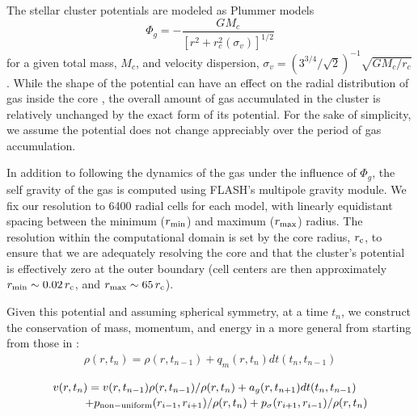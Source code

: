 \documentclass[fleqn,usenatbib]{mnras}
\begin{document}
 The stellar cluster potentials are modeled as Plummer models \citep{bruns2009,pflamm2009}
\begin{equation}
\Phi_g = - \frac{G M_c}{\left[r^2 + r_c^2(\sigma_v) \right]^{1/2}}
\end{equation}
for a  given total mass, $M_c$, and velocity dispersion, 
$\sigma_v = \left(3^{3/4}/ \sqrt{2}\right)^{-1} \sqrt{G M_c/r_c}$.  
While the shape of the potential can have an effect on the radial distribution of gas  inside the core 
\citep{pflamm2009,naiman2011}, the overall amount of gas accumulated in the cluster  is relatively unchanged 
by the exact form of its potential.  For the sake of simplicity, we assume the potential does not change appreciably over the period of gas accumulation.

In addition to following the dynamics of the 
gas under the influence of $\Phi_g$, 
the self gravity of the gas is computed using FLASH's multipole gravity module.  
We fix our resolution to 6400 radial cells for each model, with linearly equidistant spacing between the minimum ($r_{\rm min}$) and maximum ($r_{\rm max}$) radius. 
The resolution within the computational domain  is 
set by the core radius, $r_{\rm c}$, to ensure that we are adequately resolving the 
core  and that the cluster's potential is effectively zero at the outer boundary (cell centers are then approximately $r_{\rm min} \sim 0.02 \, r_{\rm c}$, and $r_{\rm max} \sim 65 \, r_{\rm c}$).


 Given this potential and assuming spherical symmetry, at a time $t_{n}$, we construct the conservation of mass, momentum, and energy in a more general from starting from those in \citep{hue2010,priestley2011}:
\begin{equation}
\begin{multlined}
\rho(r,t_n) = \rho(r,t_{n-1}) + q_{m}(r,t_{n}) dt(t_n,t_{n-1})
\end{multlined}
\label{eq:massconsLong}
\end{equation}

\begin{equation}
\begin{multlined}
v(r,t_{n}) =  v(r,t_{n-1}) \rho(r,t_{n-1})/\rho(r,t_{n}) + a_g(r,t_{n+1})dt(t_n,t_{n-1}) \\
{+ p_{\rm non-uniform}(r_{i-1} ,r_{i+1})/\rho(r,t_{n}) + p_\sigma(r_{i+1},r_{i-1})/\rho(r,t_{n})}
\end{multlined}
\label{eq:momentumLong}
\end{equation}
\end{document}
